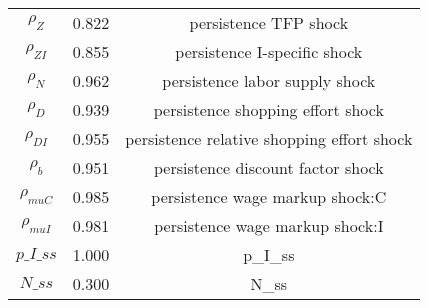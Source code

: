 \begin{center}
\begin{longtable}{ccc}
${\rho_Z}$ 	 & 	 0.822 	 & 	 persistence TFP shock\\
${\rho_{ZI}}$ 	 & 	 0.855 	 & 	 persistence I-specific shock\\
${\rho_N}$ 	 & 	 0.962 	 & 	 persistence labor supply shock\\
${\rho_D}$ 	 & 	 0.939 	 & 	 persistence shopping effort shock\\
${\rho_{DI}}$ 	 & 	 0.955 	 & 	 persistence relative shopping effort shock\\
${\rho_b}$ 	 & 	 0.951 	 & 	 persistence discount factor shock\\
${\rho_{muC}}$ 	 & 	 0.985 	 & 	 persistence wage markup shock:C\\
${\rho_{muI}}$ 	 & 	 0.981 	 & 	 persistence wage markup shock:I\\
$p\_I\_ss$ 	 & 	 1.000 	 & 	 p\_I\_ss\\
$N\_ss$ 	 & 	 0.300 	 & 	 N\_ss\\
\bottomrule%
\end{longtable}
\end{center}
